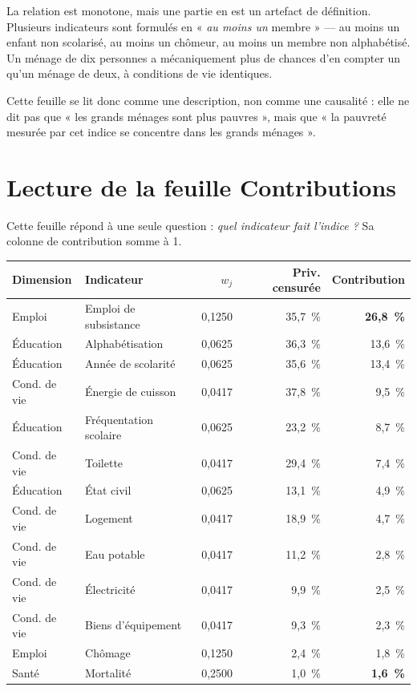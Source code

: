 \documentclass[11pt,a4paper]{article}
\begin{document}
\begin{attention}
La relation est monotone, mais une partie en est un artefact de définition. Plusieurs indicateurs
sont formulés en « \emph{au moins un} membre » --- au moins un enfant non scolarisé, au moins un
chômeur, au moins un membre non alphabétisé. Un ménage de dix personnes a mécaniquement plus de
chances d'en compter un qu'un ménage de deux, à conditions de vie identiques.

Cette feuille se lit donc comme une description, non comme une causalité : elle ne dit pas que
« les grands ménages sont plus pauvres », mais que « la pauvreté mesurée par cet indice se
concentre dans les grands ménages ».
\end{attention}

\section{Lecture de la feuille \textsf{Contributions}}

Cette feuille répond à une seule question : \emph{quel indicateur fait l'indice ?} Sa colonne de
contribution somme à 1.

\begin{center}
\small
\begin{tabular}{@{}llrrr@{}}
\toprule
\textbf{Dimension} & \textbf{Indicateur} & $w_j$ & \textbf{Priv. censurée} &
  \textbf{Contribution} \\
\midrule
Emploi & Emploi de subsistance & 0,1250 & 35,7~\% & \textbf{26,8~\%} \\
Éducation & Alphabétisation & 0,0625 & 36,3~\% & 13,6~\% \\
Éducation & Année de scolarité & 0,0625 & 35,6~\% & 13,4~\% \\
Cond. de vie & Énergie de cuisson & 0,0417 & 37,8~\% & 9,5~\% \\
Éducation & Fréquentation scolaire & 0,0625 & 23,2~\% & 8,7~\% \\
Cond. de vie & Toilette & 0,0417 & 29,4~\% & 7,4~\% \\
Éducation & État civil & 0,0625 & 13,1~\% & 4,9~\% \\
Cond. de vie & Logement & 0,0417 & 18,9~\% & 4,7~\% \\
Cond. de vie & Eau potable & 0,0417 & 11,2~\% & 2,8~\% \\
Cond. de vie & Électricité & 0,0417 & 9,9~\% & 2,5~\% \\
Cond. de vie & Biens d'équipement & 0,0417 & 9,3~\% & 2,3~\% \\
Emploi & Chômage & 0,1250 & 2,4~\% & 1,8~\% \\
Santé & Mortalité & 0,2500 & 1,0~\% & \textbf{1,6~\%} \\
\bottomrule
\end{tabular}
\end{center}
\end{document}
